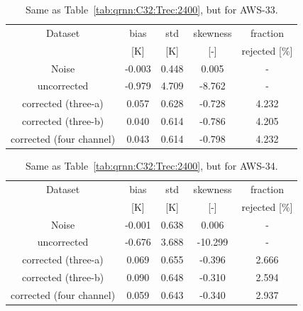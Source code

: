 \documentclass[12pt]{article}
\begin{document}
\begin{table}[!p]
	\centering
	\begin{tabular}[b]{c|c|c|c|c}
		Dataset  		  &   bias &   std &   skewness & fraction  \\
		&   [K]  &   [K] & [-] & rejected [\%]\\
		\hline
 Noise                     & -0.003 & 0.448 &              0.005 &      - \\
uncorrected                & -0.979 & 4.709 &             -8.762 &      - \\
corrected (three-a) &  0.057 & 0.628 &             -0.728 &      4.232 \\
corrected (three-b) &  0.040 & 0.614 &             -0.786 &      4.205 \\
corrected (four channel)   &  0.043 & 0.614 &             -0.798 &      4.232 \\
		\hline
	\end{tabular}
	\caption{ Same as Table~\ref{tab:qrnn:C32:Trec:2400}, but for AWS-33.  }
	\label{tab:qrnn:C33:Trec:2400}
\end{table}

\begin{table}[!p]
	\centering
	\begin{tabular}[b]{c|c|c|c|c}
		Dataset  		  &   bias &   std &   skewness & fraction  \\
		&   [K]  &   [K] & [-] & rejected [\%]\\
		\hline
 Noise                      & -0.001 & 0.638 &              0.006 &      - \\
uncorrected                 & -0.676 & 3.688 &            -10.299 &      - \\
 corrected (three-a) &  0.069 & 0.655 &             -0.396 &      2.666 \\
corrected (three-b)  &  0.090 & 0.648 &             -0.310 &      2.594 \\
corrected (four channel)    &  0.059 & 0.643 &             -0.340 &      2.937 \\
		\hline
	\end{tabular}
	\caption{ Same as Table~\ref{tab:qrnn:C32:Trec:2400}, but for AWS-34.  }
	\label{tab:qrnn:C34:Trec:2400}
\end{table}
\end{document}
